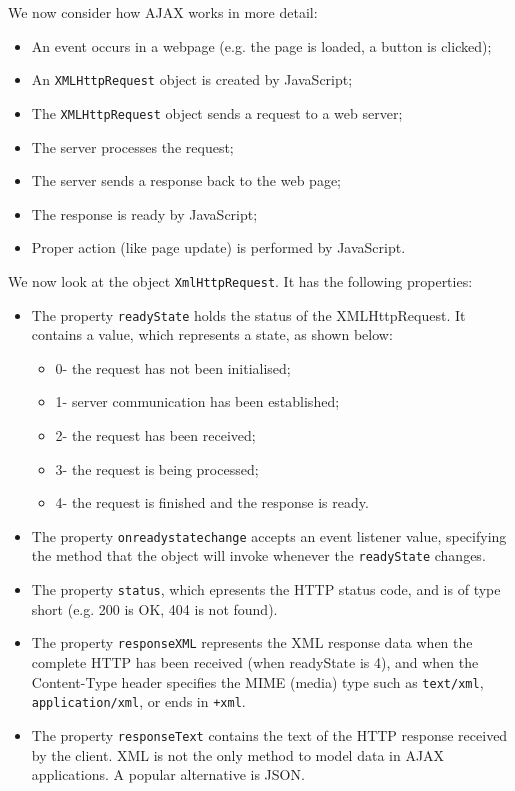 \documentclass[a4paper, openany]{memoir}
\begin{document}
\noindent We now consider how AJAX works in more detail:
\begin{itemize}
    \item An event occurs in a webpage (e.g. the page is loaded, a button is clicked);
    \item An \texttt{XMLHttpRequest} object is created by JavaScript;
    \item The \texttt{XMLHttpRequest} object sends a request to a web server;
    \item The server processes the request;
    \item The server sends a response back to the web page;
    \item The response is ready by JavaScript;
    \item Proper action (like page update) is performed by JavaScript.
\end{itemize}
We now look at the object \texttt{XmlHttpRequest}. It has the following properties:
\begin{itemize}
    \item The property \texttt{readyState} holds the status of the XMLHttpRequest. It contains a value, which represents a state, as shown below:
    \begin{itemize}
        \item 0- the request has not been initialised;
        \item 1- server communication has been established;
        \item 2- the request has been received;
        \item 3- the request is being processed;
        \item 4- the request is finished and the response is ready.
    \end{itemize}
    \item The property \texttt{onreadystatechange} accepts an event listener value, specifying the method that the object will invoke whenever the \texttt{readyState} changes.
    \item The property \texttt{status}, which epresents the HTTP status code, and is of type short (e.g. 200 is OK, 404 is not found).
    \item The property \texttt{responseXML} represents the XML response data when the complete HTTP has been received (when readyState is 4), and when the Content-Type header specifies the MIME (media) type such as \texttt{text/xml},  \texttt{application/xml}, or ends in \texttt{+xml}.
    \item The property \texttt{responseText} contains the text of the HTTP response received by the client. XML is not the only method to model data in AJAX applications. A popular alternative is JSON.
\end{itemize}
\end{document}
